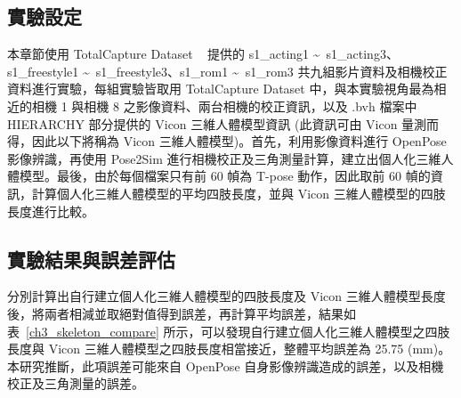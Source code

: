 \subsection{實驗設定}
本章節使用 TotalCapture Dataset ~\cite{Trumble:BMVC:2017} 提供的 s1\_acting1 \textasciitilde\ s1\_acting3、s1\_freestyle1 \textasciitilde\ s1\_freestyle3、s1\_rom1 \textasciitilde\ s1\_rom3 共九組影片資料及相機校正資料進行實驗，每組實驗皆取用 TotalCapture Dataset  中，與本實驗視角最為相近的相機 1 與相機 8 之影像資料、兩台相機的校正資訊，以及 .bvh 檔案中 HIERARCHY 部分提供的 Vicon 三維人體模型資訊 (此資訊可由 Vicon 量測而得，因此以下將稱為 Vicon 三維人體模型)。首先，利用影像資料進行 OpenPose 影像辨識，再使用 Pose2Sim 進行相機校正及三角測量計算，建立出個人化三維人體模型。最後，由於每個檔案只有前 60 幀為 T-pose 動作，因此取前 60 幀的資訊，計算個人化三維人體模型的平均四肢長度，並與 Vicon 三維人體模型的四肢長度進行比較。

\subsection{實驗結果與誤差評估}
分別計算出自行建立個人化三維人體模型的四肢長度及 Vicon 三維人體模型長度後，將兩者相減並取絕對值得到誤差，再計算平均誤差，結果如表~\ref{ch3_skeleton_compare} 所示，可以發現自行建立個人化三維人體模型之四肢長度與 Vicon 三維人體模型之四肢長度相當接近，整體平均誤差為 25.75 (mm)。本研究推斷，此項誤差可能來自 OpenPose 自身影像辨識造成的誤差，以及相機校正及三角測量的誤差。

